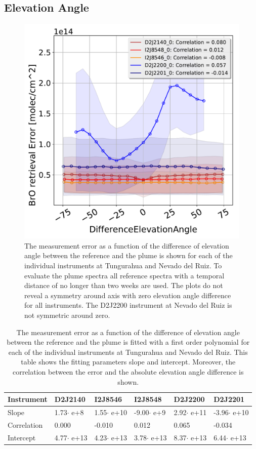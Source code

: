 \subsection{Elevation Angle}

\begin{figure}
	\centering
	\includegraphics[width=0.7\linewidth]{Bilder/DiffElevAngleallInstruments}
	\caption{The  measurement error as a function of the difference of elevation angle between the reference and the plume is shown for each of the individual instruments at Tungurahua and Nevado del Ruiz. To evaluate the plume spectra all reference spectra with a temporal distance of no longer than two weeks are used. The plots do not reveal a symmetry around axis with zero elevation angle difference for all instruments. The D2J2200 instrument at Nevado del Ruiz is not symmetric around zero.}
	\label{fig:diffeleangle}
\end{figure}
\begin{table}[h]
	\centering
	\begin{tabular}{|p{2cm}|p{2cm}|p{2cm}|p{2cm}|p{2cm}|p{2cm}|}
		Instrument	&D2J2140&I2J8546& I2J8548&D2J2200&D2J2201\\
		\toprule
		Slope& 1.73$\cdot$ e+8& 1.55$\cdot$ e+10  &-9.00$\cdot$ e+9 &2.92$\cdot$ e+11&-3.96$\cdot$ e+10\\
		\midrule
		Correlation&
		0.000&
		-0.010&
		0.012&
		0.065&
		-0.034\\
		\midrule
		Intercept&4.77$\cdot$ e+13&4.23$\cdot$ e+13&3.78$\cdot$ e+13&8.37$\cdot$ e+13 &6.44$\cdot$ e+13 \\
		\bottomrule
	\end{tabular}
	\caption{The  measurement error as a function of the difference of elevation angle between the reference and the plume is fitted with a first order polynomial for each of the individual instruments at Tungurahua and Nevado del Ruiz. This table shows the fitting parameters slope and intercept. Moreover, the correlation between the  error and the absolute elevation angle difference is shown. }
\end{table}
